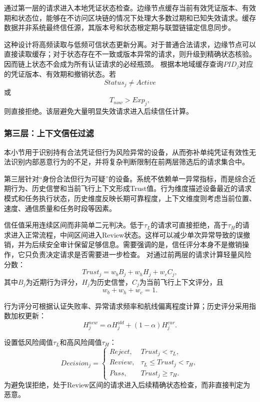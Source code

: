 \documentclass[conference]{IEEEtran}
\begin{document}
	通过第一层的请求进入本地凭证状态检查。边缘节点缓存当前有效凭证版本、有效期和状态位，能够在不访问区块链的情况下处理大多数过期和已知失效请求。缓存数据并非系统最终信任源，其版本号和状态根定期与联盟链锚定信息同步。
	
	这种设计将高频读取与低频可信状态更新分离。对于普通合法请求，边缘节点可以直接读取缓存；对于状态存在不一致或版本异常的请求，则升级到精确状态核验。因而链上状态不会成为所有认证请求的必经瓶颈。
	根据本地域缓存查询$PID_j$对应的凭证版本、有效期和撤销状态。若
	\begin{equation}
		Status_j\neq Active
	\end{equation}
	或
	\begin{equation}
		T_{now}>Exp_j,
	\end{equation}
	则直接拒绝。该层避免大量明显失效请求进入后续信任计算。
	
	\subsubsection{第三层：上下文信任过滤}
	
	本小节用于识别持有合法凭证但行为风险异常的设备，从而弥补单纯凭证有效性无法识别内部恶意行为的不足，并将复杂判断限制在前两层筛选后的请求集合中。
	
	第三层针对“身份合法但行为可疑”的设备。系统不依赖单一异常指标，而是综合近期行为、历史信誉和当前飞行上下文形成Trust值。行为维度描述设备最近的请求模式和任务执行状态，历史维度反映长期可靠程度，上下文维度则考虑当前位置、速度、通信质量和任务时段等因素。
	
	信任值采用连续区间而非简单二元判决。低于$\tau_L$的请求可直接拒绝，高于$\tau_H$的请求进入正常流程，中间区间进入Review状态。这样可以减少单次异常导致的误撤销，并为后续安全审计保留足够信息。需要强调的是，信任评分本身不是撤销操作，它只负责决定请求是否需要进一步检查。
	对通过前两层的请求计算轻量风险分数：
	\begin{equation}
		Trust_j=w_bB_j+w_hH_j+w_cC_j,
	\end{equation}
	其中$B_j$为近期行为评分，$H_j$为历史信誉，$C_j$为当前飞行上下文评分，且
	\begin{equation}
		w_b+w_h+w_c=1.
	\end{equation}
	
	行为评分可根据认证失败率、异常请求频率和航线偏离程度计算；历史评分采用指数加权更新：
	\begin{equation}
		H_j^{new}=\alpha H_j^{old}+(1-\alpha)H_j^{cur}.
	\end{equation}
	
	设置低风险阈值$\tau_L$和高风险阈值$\tau_H$：
	\begin{equation}
		Decision_j=
		\begin{cases}
			Reject,&Trust_j<\tau_L,\\
			Review,&\tau_L\le Trust_j<\tau_H,\\
			Pass,&Trust_j\ge\tau_H.
		\end{cases}
	\end{equation}
	为避免误拒绝，处于Review区间的请求进入后续精确状态检查，而非直接判定为恶意。
	
\end{document}
